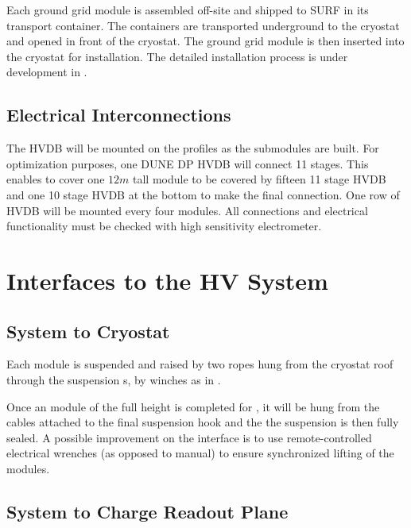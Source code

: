 Each ground grid module is assembled off-site and shipped to SURF in its transport container.   The containers are transported underground to the cryostat and opened in front of the cryostat.  The ground grid module is then inserted into the cryostat for installation. The detailed installation process is under development in .


\subsection{Electrical Interconnections}
\label{sec:fddp-prod-assy-elec-connec}

The HVDB will be mounted on the profiles as the submodules are built.  For optimization purposes, one DUNE DP HVDB will connect 11 stages.  This enables to cover one $12m$ tall module to be covered by fifteen 11 stage HVDB and one 10 stage HVDB at the bottom to make the final connection.   One row of HVDB will be mounted every four \fc modules.  All connections and electrical functionality must be checked with high sensitivity electrometer.


\section{Interfaces to the HV System}
\label{sec:fddp-hv-intfc}

\subsection{System to Cryostat}
\label{sec:fddp-hv-intfc-to-cryostat}

Each \fc module is suspended and raised by two ropes hung from the cryostat roof through the \fc suspension \fdth{}s, by winches as in .  

Once an \fc module of the full height is completed for , it will be hung 
from the cables attached to the final suspension hook and the  
 the suspension \fdth is then fully sealed. 
A possible improvement on the  interface is to use remote-controlled electrical wrenches (as opposed to manual) to ensure synchronized lifting of the modules.

\subsection{System to Charge Readout Plane}
\label{sec:fddp-hv-intfc-to-crp}

